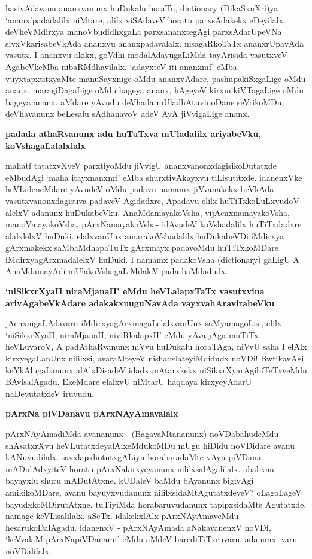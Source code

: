 \noindent
hasivAdavanu ananxvanunx huDukalu horaTu, {\rm dictionary} (DikaSxnXri)ya `ananx'\-padadalilx niMtare, alilx viSAdaveV horatu parxsAdakekx eDeyilalx. deVheVMdirxya manoVbudidhxgaLa parxsananxtegAgi parxsAda\-rUpeVNa sivxVkarisabeVkAda ananxvu ananx\-padavalalx. nisagaRkoTaTx ananxrUpavAda vasutx. I ananxvu akikx, goVdhi modalAdavugaLiMda tayArisida vasutxveV AgabeVkeMba nibaRMdhavilalx. `adayxteV iti ananxmf' eMba vuyxtapxtitxyaMte manuSayxnige oMdu ananxvAdare, pashupakiSxgaLige oMdu ananx, maragiDagaLige oMdu bageya ananx, hAgeyeV kirxmikiVTagaLige oMdu bageya ananx. aMdare yAvudu deVhada mUladhAtuvi\-noDane seVrikoMDu, deVhavanunx beLesalu sAdhanavoV adeV AyA jiVvigaLige ananx.

{\bigskip
\noindent
{\large\bf padada athaRvanunx adu huTuTxva mUladalilx ariyabeVku, koVshagaLalalxlalx}}
\medskip

\noindent
mahatf tatatxvXveV parxtiyoMdu jiVvigU ananxvanonxdagisikoDutatxde eMbu\-dAgi `maha itayxnanxmf' eMba shurxtivAkayxvu tiLisutitxde. idanenxVke heVLideneMdare yAvudeV oMdu padavu namamx jiVvanakekx beVkAda vasutxvanonxdagisuva padaveV Agidadxre, A\break padavu elilx huTiTxkoLuLxvudoV alelxV adanunx huDukabeVku. AnaMdamayakoVsha, vijAcnxnamayakoVsha, manoVmayakoVsha, pArxNamayakoVsha- idAvudeV koVsha\-dalilx huTiTxdadxre alalxlelxV huDuki. elalxvanUnx amarakoVshadalilx huDukabeVDi.\break iMdirxya gArxmakekx saMbaMdha\-paTuTx gArxmayx padavoMdu huTiTxkoMDare iMdirxya\-gArxma\-dalelxV huDuki. I namamx padakoVsha {\rm (dictionary)} gaLigU A AnaMdamayAdi mUlakoVsha\-gaLiMdaleV pada baMdadudx.

{\bigskip
\noindent
{\large\bf `niSikxrXyaH niraMjanaH' eMdu heVLalapxTaTx vasutxvina arivAgabeVkAdare adakakxnuguNavAda vayxvahAra\-virabeVku}}
\medskip

\noindent
jAcnxnigaLAdavaru iMdirxyagArxmagaLelalxvanUnx saMyamagoLisi, elilx `niSikxrXyaH, niraMjanaH, niviR\-kalapxH' eMdu yAva jAga muTiTx heVLuvaroV, A padAthaRvanunx niVvu huDukalu horaTAga, niVvU saha I elAlx kirxyegaLanUnx nililxsi, avaraMteyeV nishacxlateyiMdidudx noVDi! BwtikavAgi keYkAlugaLanunx alAlxDisadeV idadx mAtarxkekx niSikxrXyarAgibiTeTxveMdu BAvisalAgadu. EkeMdare elalxvU niMtarU haqdaya kirxyeyAdarU naDeyutatxleV iruvudu.

\newpage
{\noindent
{\large\bf pArxNa piVDanavu pArxNAyAmavalalx}}\label{page202}
\medskip

\noindent
pArxNAyAmadiMda avananunx - (BagavaMtananunx) noVDabahudeMdu shAsatxrXvu heVLutatxdeyalAlx\break eMdukoMDu mUgu hiDidu noVDidare avanu kANuvudilalx. savxlapxhotutx\break gALiyu horabaradaMte vAyu piVDana mADi\-dAdxyiteV horatu pArxNakirxye\-yanunx nililxsalAgalilalx. obabxnu bayayxlu shuru mADutAtxne, kUDaleV baMdu \hbox{bAyanunx} bigiyAgi amikikoMDare, avanu bayuyxvudanunx nililxsidaMtAgu\-tatxdeyeV? oLago\-LageV bayudxkoMDirutAtxne. tuTiyiMda horabaruvudanunx tapipxsidaMte Agutatxde. namage keVLisa\-lilalx, aSeTx. idakekxlAlx pArxNAyAmaveMdu hesarukoDalAgadu. idanenxV - pArxNAyAmada aNakavanenxV noVDi, `keVvalaM pArxNapiVDanamf' eMdu aMdeV barediTiTxruvaru. adanunx ivaru noVDalilalx.

